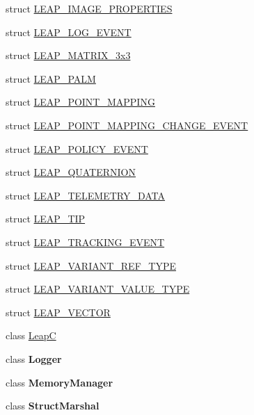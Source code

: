 \begin{DoxyCompactItemize}
\item 
struct \mbox{\hyperlink{struct_leap_internal_1_1_l_e_a_p___i_m_a_g_e___p_r_o_p_e_r_t_i_e_s}{L\+E\+A\+P\+\_\+\+I\+M\+A\+G\+E\+\_\+\+P\+R\+O\+P\+E\+R\+T\+I\+ES}}
\item 
struct \mbox{\hyperlink{struct_leap_internal_1_1_l_e_a_p___l_o_g___e_v_e_n_t}{L\+E\+A\+P\+\_\+\+L\+O\+G\+\_\+\+E\+V\+E\+NT}}
\item 
struct \mbox{\hyperlink{struct_leap_internal_1_1_l_e_a_p___m_a_t_r_i_x__3x3}{L\+E\+A\+P\+\_\+\+M\+A\+T\+R\+I\+X\+\_\+3x3}}
\item 
struct \mbox{\hyperlink{struct_leap_internal_1_1_l_e_a_p___p_a_l_m}{L\+E\+A\+P\+\_\+\+P\+A\+LM}}
\item 
struct \mbox{\hyperlink{struct_leap_internal_1_1_l_e_a_p___p_o_i_n_t___m_a_p_p_i_n_g}{L\+E\+A\+P\+\_\+\+P\+O\+I\+N\+T\+\_\+\+M\+A\+P\+P\+I\+NG}}
\item 
struct \mbox{\hyperlink{struct_leap_internal_1_1_l_e_a_p___p_o_i_n_t___m_a_p_p_i_n_g___c_h_a_n_g_e___e_v_e_n_t}{L\+E\+A\+P\+\_\+\+P\+O\+I\+N\+T\+\_\+\+M\+A\+P\+P\+I\+N\+G\+\_\+\+C\+H\+A\+N\+G\+E\+\_\+\+E\+V\+E\+NT}}
\item 
struct \mbox{\hyperlink{struct_leap_internal_1_1_l_e_a_p___p_o_l_i_c_y___e_v_e_n_t}{L\+E\+A\+P\+\_\+\+P\+O\+L\+I\+C\+Y\+\_\+\+E\+V\+E\+NT}}
\item 
struct \mbox{\hyperlink{struct_leap_internal_1_1_l_e_a_p___q_u_a_t_e_r_n_i_o_n}{L\+E\+A\+P\+\_\+\+Q\+U\+A\+T\+E\+R\+N\+I\+ON}}
\item 
struct \mbox{\hyperlink{struct_leap_internal_1_1_l_e_a_p___t_e_l_e_m_e_t_r_y___d_a_t_a}{L\+E\+A\+P\+\_\+\+T\+E\+L\+E\+M\+E\+T\+R\+Y\+\_\+\+D\+A\+TA}}
\item 
struct \mbox{\hyperlink{struct_leap_internal_1_1_l_e_a_p___t_i_p}{L\+E\+A\+P\+\_\+\+T\+IP}}
\item 
struct \mbox{\hyperlink{struct_leap_internal_1_1_l_e_a_p___t_r_a_c_k_i_n_g___e_v_e_n_t}{L\+E\+A\+P\+\_\+\+T\+R\+A\+C\+K\+I\+N\+G\+\_\+\+E\+V\+E\+NT}}
\item 
struct \mbox{\hyperlink{struct_leap_internal_1_1_l_e_a_p___v_a_r_i_a_n_t___r_e_f___t_y_p_e}{L\+E\+A\+P\+\_\+\+V\+A\+R\+I\+A\+N\+T\+\_\+\+R\+E\+F\+\_\+\+T\+Y\+PE}}
\item 
struct \mbox{\hyperlink{struct_leap_internal_1_1_l_e_a_p___v_a_r_i_a_n_t___v_a_l_u_e___t_y_p_e}{L\+E\+A\+P\+\_\+\+V\+A\+R\+I\+A\+N\+T\+\_\+\+V\+A\+L\+U\+E\+\_\+\+T\+Y\+PE}}
\item 
struct \mbox{\hyperlink{struct_leap_internal_1_1_l_e_a_p___v_e_c_t_o_r}{L\+E\+A\+P\+\_\+\+V\+E\+C\+T\+OR}}
\item 
class \mbox{\hyperlink{class_leap_internal_1_1_leap_c}{LeapC}}
\item 
class {\bfseries Logger}
\item 
class {\bfseries Memory\+Manager}
\item 
class {\bfseries Struct\+Marshal}
\end{DoxyCompactItemize}
